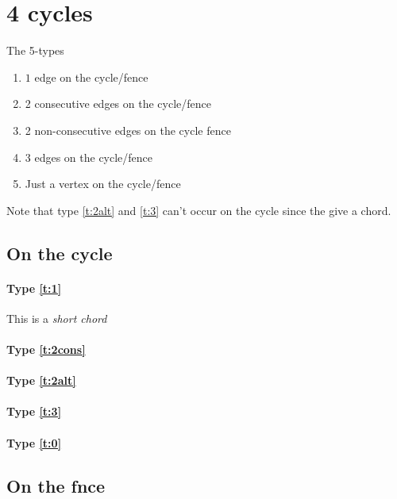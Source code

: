 \section{4 cycles}

The 5-types
\begin{enumerate}
  \renewcommand*{\labelenumi}{(\alph{enumi})}%
  \renewcommand*{\theenumi}{(\alph{enumi})}%

  \item $1$ edge on the cycle/fence
  \label{t:1}
  \item 2 consecutive edges on the cycle/fence
  \label{t:2cons}
  \item 2 non-consecutive edges on the cycle fence
  \label{t:2alt}
  \item 3 edges on the cycle/fence
  \label{t:3}
  \item Just a vertex on the cycle/fence
  \label{t:0}
\end{enumerate}

Note that type \ref{t:2alt} and \ref{t:3} can't occur on the cycle since the give a chord.

\subsection{On the cycle}

\paragraph{Type \ref{t:1}}
This is a \emph{short chord}


\paragraph{Type \ref{t:2cons}}

\paragraph{Type \ref{t:2alt}}

\paragraph{Type \ref{t:3}}

\paragraph{Type \ref{t:0}}




\subsection{On the fnce}


